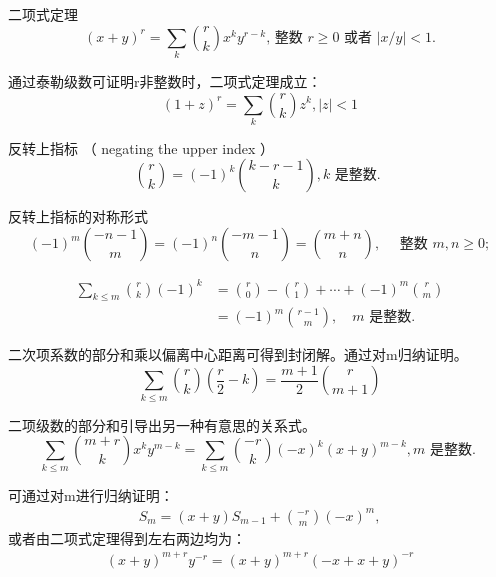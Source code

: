 二项式定理
\begin{equation}
    (x+y)^{r}=\sum_{k}{r \choose k} x^{k} y^{r-k} \text {, 整数 } r \geqslant 0 \text { 或者 }|x / y|<1 .
\end{equation}

通过泰勒级数可证明r非整数时，二项式定理成立：
\begin{equation}
    (1+z)^{r}=\sum_{k}{r \choose k} z^{k},|z|<1
\end{equation}

反转上指标 （ negating the upper index ）
\begin{equation}
    {r \choose k}=(-1)^{k}{k-r-1 \choose k}, k \text { 是整数. }
\end{equation}

反转上指标的对称形式
\begin{equation}
    (-1)^{m}{-n-1 \choose m}=(-1)^{n}{-m-1 \choose n} = {m+n \choose n}, \quad \text { 整数 } m, n \geqslant 0 ;
\end{equation}

\begin{equation}
    \begin{aligned}
    \sum_{k \leqslant m}{r \choose k}(-1)^{k} &={r \choose 0}-{r \choose 1}+\cdots+(-1)^{m}{r \choose m} \\
    &=(-1)^{m}{r-1 \choose m}, \quad m \text { 是整数. }
    \end{aligned}
\end{equation}

\setcounter{equation}{17}
二次项系数的部分和乘以偏离中心距离可得到封闭解。通过对m归纳证明。
\begin{equation}
    \sum_{k\le m} {r \choose k}(\frac{r}{2}-k) = \frac{m+1}{2}{r \choose m+1}
\end{equation}

二项级数的部分和引导出另一种有意思的关系式。
\begin{equation}
    \sum_{k \leqslant m}{m+r \choose k} x^{k} y^{m-k}=\sum_{k \leqslant m}{-r \choose k}(-x)^{k}(x+y)^{m-k}, m \text { 是整数. }
\end{equation}

可通过对m进行归纳证明：
\begin{align*}
    S_{m}=(x+y) S_{m-1}+{-r \choose m}(-x)^{m},
\end{align*}
或者由二项式定理得到左右两边均为：
\begin{align*}
    (x+y)^{m+r}y^{-r} = (x+y)^{m+r}(-x+x+y)^{-r}
\end{align*}

